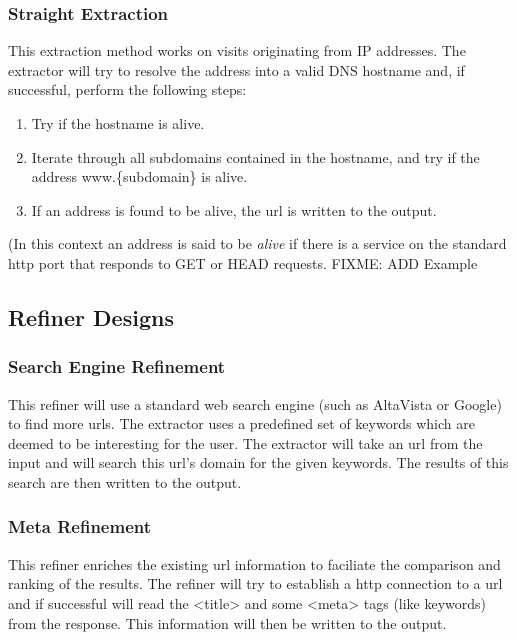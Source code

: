 \documentclass[a4paper]{danarticle}
\begin{document}
      \subsubsection*{Straight Extraction}
        This extraction method works on visits originating from IP addresses. 
	The extractor will try to resolve the address into a valid DNS hostname
	and, if successful, perform the following steps:
	\begin{enumerate}
	  \item{Try if the hostname is alive.}
	  \item{Iterate through all subdomains contained in the hostname, and
	        try if the address www.\{subdomain\} is alive.}
          \item{If an address is found to be alive, the url is written to the
	        output.}
	\end{enumerate}
	(In this context an address is said to be \textit{alive} if there is a
	service on the standard http port that responds to GET or HEAD requests.
	FIXME: ADD Example \\
    \subsection*{Refiner Designs}
      \subsubsection*{Search Engine Refinement}
        This refiner will use a standard web search engine (such as AltaVista
	or Google) to find more urls. The extractor uses a predefined set
	of keywords which are deemed to be interesting for the user.
	The extractor will take an url from the input and will search this
	url's domain for the given keywords. The results of this
	search are then written to the output.
      \subsubsection*{Meta Refinement}
        This refiner enriches the existing url information to faciliate the
	comparison and ranking of the results. The refiner will try to establish
	a http connection to a url and if successful will read the 
	<title> and some <meta> tags (like keywords) from the response. This
	information will then be written to the output. 
\end{document}
